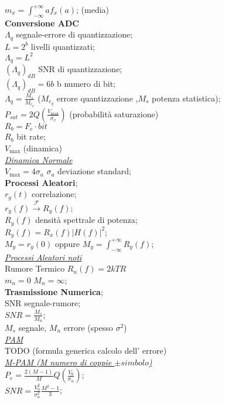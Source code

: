 \documentclass[a4paper]{article}
\begin{document}
\begin{multicols*}{3}
$m_x=\int_{-\infty}^{+\infty} a f_x(a)$; (media)\\
\textbf{Conversione ADC} \\
$\Lambda_q$ segnale-errore di quantizzazione; \\
$L=2^b$ livelli quantizzati; \\
$\Lambda_q = L^2$ \\
${(\Lambda_q)}_{dB}$ SNR di quantizzazione; \\
${(\Lambda_q)}_{dB} = 6b$ b numero di bit; \\
${\Lambda}_q=\frac{M_s}{M_{e_q}}$ ($M_{e_q}$ errore quantizzazione 
,$M_s$ potenza statistica); \\
$P_{sat}=2Q(\frac{V_{\max}}{\sigma_x})$ (probabilità saturazione) \\
$R_b=F_c \cdot bit$ \\
$R_b$ bit rate; \\
$V_{\max}$ (dinamica) \\
\underline{\textit{Dinamica Normale}} \\
$V_{\max} = 4\sigma_a$ $\sigma_a$ deviazione standard;\\ 
\textbf{Processi Aleatori}; \\
$r_y(t)$ correlazione; \\
$r_y(f) \xrightarrow{\mathscr{F}} R_y(f)$; \\ 
$R_y(f)$ densità spettrale di potenza; \\
$R_y(f) = R_x(f) |H(f)|^2$; \\
$M_y = r_y(0)$ oppure 
$M_y = \int_{-\infty}^{+\infty} R_y(f)$;\\
\underline{\textit{Processi Aleatori noti}} \\
Rumore Termico $R_n(f)=2kTR$ \\
$m_n=0$ $M_n=\infty$; \\
\textbf{Trasmissione Numerica}; \\
SNR segnale-rumore; \\
$SNR=\frac{M_s}{M_n}$; \\ $M_s$ segnale, $M_n$ errore (spesso $\sigma^2$) \\ 
\underline{\textit{PAM}} \\
TODO (formula generica calcolo dell' errore) \\
\underline{\textit{M-PAM (M numero di coppie $\pm simbolo$) }} \\
$P_e = \frac{2(M-1)}{M}Q(\frac{V_0}{\sigma_n})$;\\
$SNR = \frac{V_0^2}{\sigma_n^2}\frac{M^2-1}{3}$; \\

\end{multicols*}
\end{document}
